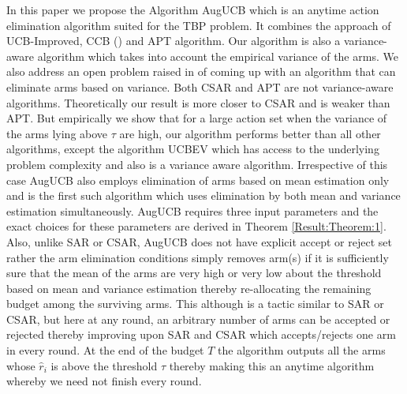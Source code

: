 In this paper we propose the Algorithm AugUCB which is an anytime action elimination algorithm suited for the TBP problem. It combines the approach of UCB-Improved, CCB (\cite{liu2016modification}) and APT algorithm. Our algorithm is also a variance-aware algorithm which takes into account the empirical variance of the arms. We also address an open problem raised in \cite{auer2010ucb} of coming up with an algorithm that can eliminate arms based on variance. Both CSAR and APT are not variance-aware algorithms. Theoretically our result is more closer to CSAR and is weaker than APT. But empirically we show that for a large action set when the variance of the arms lying above $\tau$ are high, our algorithm performs better than all other algorithms, except the algorithm UCBEV which has access to the underlying problem complexity and also is a variance aware algorithm. Irrespective of this case AugUCB also employs elimination of arms based on mean estimation only and is the first such algorithm which uses elimination by both mean and variance estimation simultaneously. AugUCB requires three input parameters and the exact choices for these parameters are derived in Theorem \ref{Result:Theorem:1}. Also, unlike SAR or CSAR, AugUCB does not have explicit accept or reject set rather the arm elimination conditions simply removes arm(s) if it is sufficiently sure that the mean of the arms are very high or very low about the threshold based on mean and variance estimation thereby re-allocating the remaining budget among the surviving arms. This although is a tactic similar to SAR or CSAR, but here at any round, an arbitrary number of arms can be accepted or rejected thereby improving upon SAR and CSAR which accepts/rejects one arm in every round. At the end of the budget $T$ the algorithm outputs all the arms whose $\hat{r}_{i}$ is above the threshold $\tau$ thereby making this an anytime algorithm whereby we need not finish every round. 

